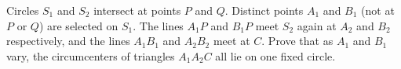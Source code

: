 Circles $S_1$ and $S_2$ intersect at points $P$ and $Q$. Distinct points $A_1$ and $B_1$ (not at $P$ or $Q$) are selected on $S_1$. The lines $A_1P$ and $B_1P$ meet $S_2$ again at $A_2$ and $B_2$ respectively, and the lines $A_1B_1$ and $A_2B_2$ meet at $C$. Prove that as $A_1$ and $B_1$ vary, the circumcenters of triangles $A_1A_2C$ all lie on one fixed circle.
